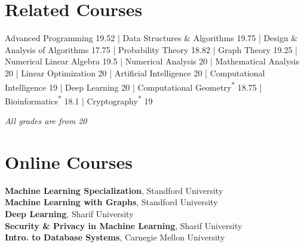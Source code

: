 	
\section{Related Courses}
Advanced Programming 19.52 | 
Data Structures \& Algorithms 19.75 | 
Design \& Analysis of Algorithms 17.75 | Probability Theory 18.82 |
Graph Theory 19.25 |
Numerical Linear Algebra 19.5 | 
Numerical Analysis 20 | 
Mathematical Analysis 20 |
Linear Optimization 20 |
Artificial Intelligence 20 | 
Computational Intelligence 19 |
Deep Learning 20 | 
Computational Geometry\textsuperscript{*} 18.75 |
Bioinformatics\textsuperscript{*}  18.1 | Cryptography\textsuperscript{*} 19 \\
\centerline{\textit{All grades are from 20}}
\section{Online Courses}
\textbf{Machine Learning Specialization}, Standford University \\
\textbf{Machine Learning with Graphs}, Standford University \\
\textbf{Deep Learning}, Sharif University \\
\textbf{Security \& Privacy in Machine Learning}, Sharif University \\
\textbf{Intro. to Database Systems}, Carnegie Mellon University 
